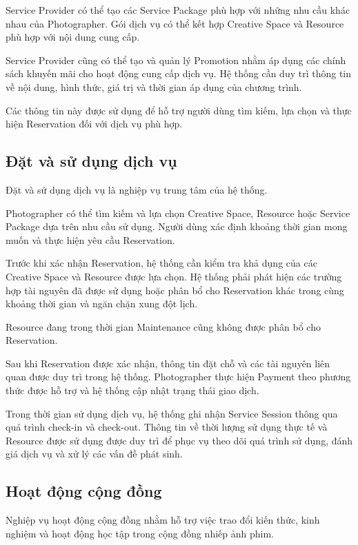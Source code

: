 Service Provider có thể tạo các Service Package phù hợp với những nhu cầu khác nhau của Photographer. Gói dịch vụ có thể kết hợp Creative Space và Resource phù hợp với nội dung cung cấp.

Service Provider cũng có thể tạo và quản lý Promotion nhằm áp dụng các chính sách khuyến mãi cho hoạt động cung cấp dịch vụ. Hệ thống cần duy trì thông tin về nội dung, hình thức, giá trị và thời gian áp dụng của chương trình.

Các thông tin này được sử dụng để hỗ trợ người dùng tìm kiếm, lựa chọn và thực hiện Reservation đối với dịch vụ phù hợp.

\subsection{Đặt và sử dụng dịch vụ}

Đặt và sử dụng dịch vụ là nghiệp vụ trung tâm của hệ thống.

Photographer có thể tìm kiếm và lựa chọn Creative Space, Resource hoặc Service Package dựa trên nhu cầu sử dụng. Người dùng xác định khoảng thời gian mong muốn và thực hiện yêu cầu Reservation.

Trước khi xác nhận Reservation, hệ thống cần kiểm tra khả dụng của các Creative Space và Resource được lựa chọn. Hệ thống phải phát hiện các trường hợp tài nguyên đã được sử dụng hoặc phân bổ cho Reservation khác trong cùng khoảng thời gian và ngăn chặn xung đột lịch.

Resource đang trong thời gian Maintenance cũng không được phân bổ cho Reservation.

Sau khi Reservation được xác nhận, thông tin đặt chỗ và các tài nguyên liên quan được duy trì trong hệ thống. Photographer thực hiện Payment theo phương thức được hỗ trợ và hệ thống cập nhật trạng thái giao dịch.

Trong thời gian sử dụng dịch vụ, hệ thống ghi nhận Service Session thông qua quá trình check-in và check-out. Thông tin về thời lượng sử dụng thực tế và Resource được sử dụng được duy trì để phục vụ theo dõi quá trình sử dụng, đánh giá dịch vụ và xử lý các vấn đề phát sinh.

\subsection{Hoạt động cộng đồng}

Nghiệp vụ hoạt động cộng đồng nhằm hỗ trợ việc trao đổi kiến thức, kinh nghiệm và hoạt động học tập trong cộng đồng nhiếp ảnh phim.

